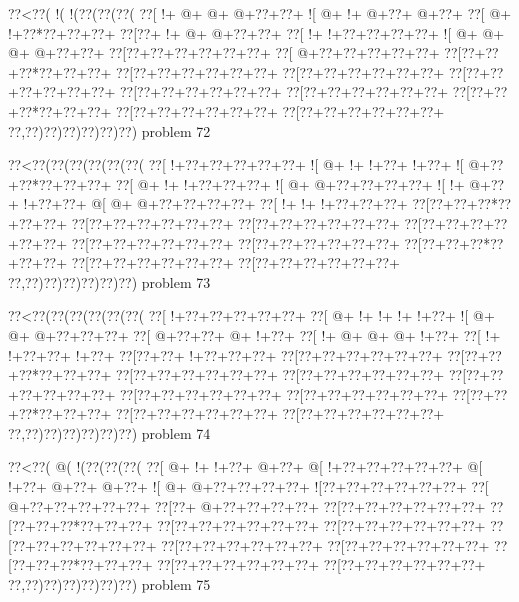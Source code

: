 \vbox{\vbox{\goo
\0??<\0??(\- !(\- !(\0??(\0??(\0??(
\0??[\- !+\- @+\- @+\- @+\0??+\0??+
\- ![\- @+\- !+\- @+\0??+\- @+\0??+
\0??[\- @+\- !+\0??*\0??+\0??+\0??+
\0??[\0??+\- !+\- @+\- @+\0??+\0??+
\0??[\- !+\- !+\0??+\0??+\0??+\0??+
\- ![\- @+\- @+\- @+\- @+\0??+\0??+
\0??[\0??+\0??+\0??+\0??+\0??+\0??+
\0??[\- @+\0??+\0??+\0??+\0??+\0??+
\0??[\0??+\0??+\0??*\0??+\0??+\0??+
\0??[\0??+\0??+\0??+\0??+\0??+\0??+
\0??[\0??+\0??+\0??+\0??+\0??+\0??+
\0??[\0??+\0??+\0??+\0??+\0??+\0??+
\0??[\0??+\0??+\0??+\0??+\0??+\0??+
\0??[\0??+\0??+\0??+\0??+\0??+\0??+
\0??[\0??+\0??+\0??*\0??+\0??+\0??+
\0??[\0??+\0??+\0??+\0??+\0??+\0??+
\0??[\0??+\0??+\0??+\0??+\0??+\0??+
\0??,\0??)\0??)\0??)\0??)\0??)\0??)
}
\hfil problem 72\hfil\break
}

\vbox{\vbox{\goo
\0??<\0??(\0??(\0??(\0??(\0??(\0??(
\0??[\- !+\0??+\0??+\0??+\0??+\0??+
\- ![\- @+\- !+\- !+\0??+\- !+\0??+
\- ![\- @+\0??+\0??*\0??+\0??+\0??+
\0??[\- @+\- !+\- !+\0??+\0??+\0??+
\- ![\- @+\- @+\0??+\0??+\0??+\0??+
\- ![\- !+\- @+\0??+\- !+\0??+\0??+
\- @[\- @+\- @+\0??+\0??+\0??+\0??+
\0??[\- !+\- !+\- !+\0??+\0??+\0??+
\0??[\0??+\0??+\0??*\0??+\0??+\0??+
\0??[\0??+\0??+\0??+\0??+\0??+\0??+
\0??[\0??+\0??+\0??+\0??+\0??+\0??+
\0??[\0??+\0??+\0??+\0??+\0??+\0??+
\0??[\0??+\0??+\0??+\0??+\0??+\0??+
\0??[\0??+\0??+\0??+\0??+\0??+\0??+
\0??[\0??+\0??+\0??*\0??+\0??+\0??+
\0??[\0??+\0??+\0??+\0??+\0??+\0??+
\0??[\0??+\0??+\0??+\0??+\0??+\0??+
\0??,\0??)\0??)\0??)\0??)\0??)\0??)
}
\hfil problem 73\hfil\break
}

\vbox{\vbox{\goo
\0??<\0??(\0??(\0??(\0??(\0??(\0??(
\0??[\- !+\0??+\0??+\0??+\0??+\0??+
\0??[\- @+\- !+\- !+\- !+\- !+\0??+
\- ![\- @+\- @+\- @+\0??+\0??+\0??+
\0??[\- @+\0??+\0??+\- @+\- !+\0??+
\0??[\- !+\- @+\- @+\- @+\- !+\0??+
\0??[\- !+\- !+\0??+\0??+\- !+\0??+
\0??[\0??+\0??+\- !+\0??+\0??+\0??+
\0??[\0??+\0??+\0??+\0??+\0??+\0??+
\0??[\0??+\0??+\0??*\0??+\0??+\0??+
\0??[\0??+\0??+\0??+\0??+\0??+\0??+
\0??[\0??+\0??+\0??+\0??+\0??+\0??+
\0??[\0??+\0??+\0??+\0??+\0??+\0??+
\0??[\0??+\0??+\0??+\0??+\0??+\0??+
\0??[\0??+\0??+\0??+\0??+\0??+\0??+
\0??[\0??+\0??+\0??*\0??+\0??+\0??+
\0??[\0??+\0??+\0??+\0??+\0??+\0??+
\0??[\0??+\0??+\0??+\0??+\0??+\0??+
\0??,\0??)\0??)\0??)\0??)\0??)\0??)
}
\hfil problem 74\hfil\break
}

\vbox{\vbox{\goo
\0??<\0??(\- @(\- !(\0??(\0??(\0??(
\0??[\- @+\- !+\- !+\0??+\- @+\0??+
\- @[\- !+\0??+\0??+\0??+\0??+\0??+
\- @[\- !+\0??+\- @+\0??+\- @+\0??+
\- ![\- @+\- @+\0??+\0??+\0??+\0??+
\- ![\0??+\0??+\0??+\0??+\0??+\0??+
\0??[\- @+\0??+\0??+\0??+\0??+\0??+
\0??[\0??+\- @+\0??+\0??+\0??+\0??+
\0??[\0??+\0??+\0??+\0??+\0??+\0??+
\0??[\0??+\0??+\0??*\0??+\0??+\0??+
\0??[\0??+\0??+\0??+\0??+\0??+\0??+
\0??[\0??+\0??+\0??+\0??+\0??+\0??+
\0??[\0??+\0??+\0??+\0??+\0??+\0??+
\0??[\0??+\0??+\0??+\0??+\0??+\0??+
\0??[\0??+\0??+\0??+\0??+\0??+\0??+
\0??[\0??+\0??+\0??*\0??+\0??+\0??+
\0??[\0??+\0??+\0??+\0??+\0??+\0??+
\0??[\0??+\0??+\0??+\0??+\0??+\0??+
\0??,\0??)\0??)\0??)\0??)\0??)\0??)
}
\hfil problem 75\hfil\break
}

